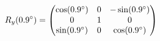 \documentclass[preview]{standalone}
\begin{document}
\begin{align*}
\special{dvisvgm:raw <g id='unique000'>}R_y(0.9^\circ) = \begin{pmatrix} \cos(0.9^\circ) & 0 & -\sin(0.9^\circ) \\ 0 & 1 & 0 \\ \sin(0.9^\circ) & 0 & \cos(0.9^\circ) \end{pmatrix}\special{dvisvgm:raw </g>}
\end{align*}
\end{document}
